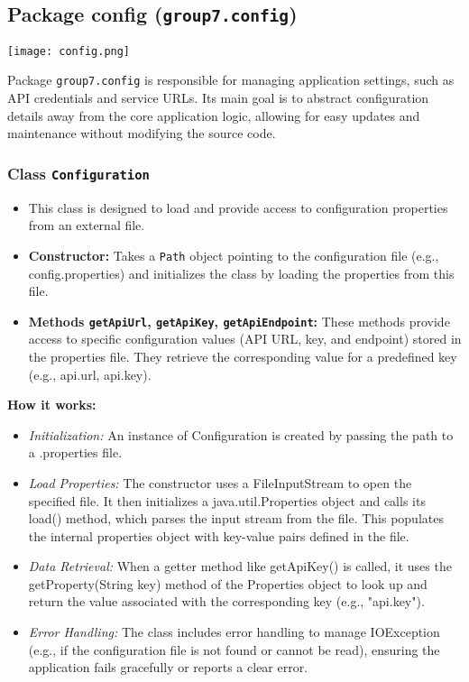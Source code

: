 \documentclass{article}
\begin{document}
\subsection{Package config (\texttt{group7.config})}

\texttt{[image: config.png]} %

Package \texttt{group7.config} is responsible for managing application settings, such as API credentials and service URLs. Its main goal is to abstract configuration details away from the core application logic, allowing for easy updates and maintenance without modifying the source code.

\subsubsection*{Class \texttt{Configuration}}
\begin{itemize}
    \item This class is designed to load and provide access to configuration properties from an external file.
    \item \textbf{Constructor:} Takes a \texttt{Path} object pointing to the configuration file (e.g., config.properties) and initializes the class by loading the properties from this file.
    \item \textbf{Methods \texttt{getApiUrl}, \texttt{getApiKey}, \texttt{getApiEndpoint}:} These methods provide access to specific configuration values (API URL, key, and endpoint) stored in the properties file. They retrieve the corresponding value for a predefined key (e.g., api.url, api.key).
\end{itemize}

\textbf{How it works:}
\begin{itemize}
    \item \textit{Initialization:} An instance of Configuration is created by passing the path to a .properties file.
    \item \textit{Load Properties:} The constructor uses a FileInputStream to open the specified file. It then initializes a java.util.Properties object and calls its load() method, which parses the input stream from the file. This populates the internal properties object with key-value pairs defined in the file.
    \item \textit{Data Retrieval:} When a getter method like getApiKey() is called, it uses the getProperty(String key) method of the Properties object to look up and return the value associated with the corresponding key (e.g., "api.key").
    \item \textit{Error Handling:} The class includes error handling to manage IOException (e.g., if the configuration file is not found or cannot be read), ensuring the application fails gracefully or reports a clear error.
\end{itemize}
\end{document}
